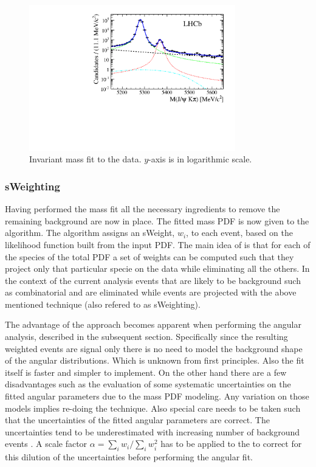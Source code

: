 \begin{figure}[h]
\centering
\includegraphics[width=0.8\textwidth]{Figures/Chapter4/mass_plot_simul_log.pdf}
\caption{Invariant mass fit to the data. $y$-axis is in logarithmic scale.}
\label{mass_plot}
\end{figure}

\subsubsection{sWeighting}
Having performed the mass fit all the necessary ingredients to remove the remaining background are now in place. 
The fitted mass PDF is now given to the \sPlot algorithm. The algorithm assigns an sWeight, $w_i$, to each event,
based on the likelihood function built from the input PDF. The main idea of \sPlot is that for each of the species of the total
PDF a set of weights can be computed such that they project only that particular specie on the data while eliminating all the others.  
In the context of the current analysis events that are likely to be background such as combinatorial and \LbJpsipK are
eliminated while \BJpsiKst events are projected with the above mentioned technique (also refered to as sWeighting).

The advantage of the \sWeights approach becomes apparent when performing the angular analysis, described in the subsequent section. Specifically since the resulting 
\BsJpsiKst weighted events are signal only there is no need to model the background shape of the angular distributions. Which
is unknown from first principles. Also the fit itself is faster and simpler to implement. On the other hand there are a few 
disadvantages such as the evaluation of some systematic uncertainties on the fitted angular parameters due to the mass PDF modeling.
Any variation on those models implies re-doing the \sPlot technique. Also special care needs to be taken such that the uncertainties
of the fitted angular parameters are correct. The uncertainties tend to be underestimated with increasing number of background events \cite{splot}.
A scale factor $\alpha = \sum_{i} w_i /\sum_{i} w_i^2$  has to be applied to the \sWeights to correct for this dilution of the uncertainties
before performing the angular fit.

